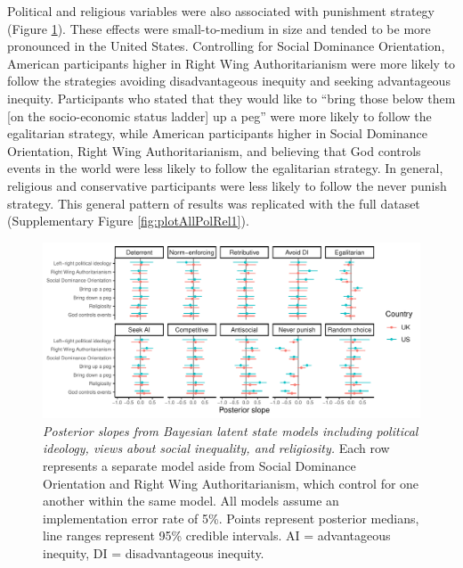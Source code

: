 \documentclass[
  english,
  man, donotrepeattitle,floatsintext]{apa6}
\begin{document}
Political and religious variables were also associated with punishment strategy
(Figure \ref{fig:plotAllPolRel2}). These effects were small-to-medium in size
and tended to be more pronounced in the United States. Controlling for Social
Dominance Orientation, American participants higher in Right Wing
Authoritarianism were more likely to follow the strategies avoiding
disadvantageous inequity and seeking advantageous inequity. Participants who
stated that they would like to ``bring those below them {[}on the socio-economic
status ladder{]} up a peg'' were more likely to follow the egalitarian strategy,
while American participants higher in Social Dominance Orientation, Right Wing
Authoritarianism, and believing that God controls events in the world were less
likely to follow the egalitarian strategy. In general, religious and
conservative participants were less likely to follow the never punish strategy.
This general pattern of results was replicated with the full dataset
(Supplementary Figure \ref{fig:plotAllPolRel1}).









\begin{figure}
\centering
\includegraphics{manuscript_files/figure-latex/plotAllPolRel2-1.pdf}
\caption{\label{fig:plotAllPolRel2}\emph{Posterior slopes from Bayesian latent state models
including political ideology, views about social inequality, and religiosity.}
Each row represents a separate model aside from Social Dominance Orientation and
Right Wing Authoritarianism, which control for one another within the same
model. All models assume an implementation error rate of 5\%. Points represent
posterior medians, line ranges represent 95\% credible intervals. AI =
advantageous inequity, DI = disadvantageous inequity.}
\end{figure}
\end{document}
